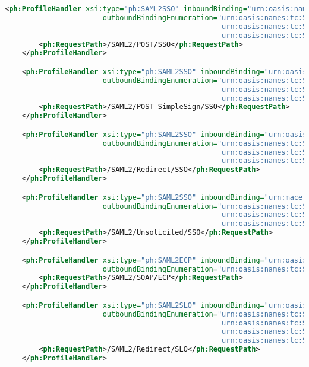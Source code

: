 \begin{lstlisting}[language=xml]
    <ph:ProfileHandler xsi:type="ph:SAML2SSO" inboundBinding="urn:oasis:names:tc:SAML:2.0:bindings:HTTP-POST"
                       outboundBindingEnumeration="urn:oasis:names:tc:SAML:2.0:bindings:HTTP-POST-SimpleSign
                                                   urn:oasis:names:tc:SAML:2.0:bindings:HTTP-POST
                                                   urn:oasis:names:tc:SAML:2.0:bindings:HTTP-Artifact">
        <ph:RequestPath>/SAML2/POST/SSO</ph:RequestPath>
    </ph:ProfileHandler>

    <ph:ProfileHandler xsi:type="ph:SAML2SSO" inboundBinding="urn:oasis:names:tc:SAML:2.0:bindings:HTTP-POST-SimpleSign"
                       outboundBindingEnumeration="urn:oasis:names:tc:SAML:2.0:bindings:HTTP-POST-SimpleSign
                                                   urn:oasis:names:tc:SAML:2.0:bindings:HTTP-POST
                                                   urn:oasis:names:tc:SAML:2.0:bindings:HTTP-Artifact">
        <ph:RequestPath>/SAML2/POST-SimpleSign/SSO</ph:RequestPath>
    </ph:ProfileHandler>

    <ph:ProfileHandler xsi:type="ph:SAML2SSO" inboundBinding="urn:oasis:names:tc:SAML:2.0:bindings:HTTP-Redirect"
                       outboundBindingEnumeration="urn:oasis:names:tc:SAML:2.0:bindings:HTTP-POST-SimpleSign
                                                   urn:oasis:names:tc:SAML:2.0:bindings:HTTP-POST
                                                   urn:oasis:names:tc:SAML:2.0:bindings:HTTP-Artifact">
        <ph:RequestPath>/SAML2/Redirect/SSO</ph:RequestPath>
    </ph:ProfileHandler>

    <ph:ProfileHandler xsi:type="ph:SAML2SSO" inboundBinding="urn:mace:shibboleth:2.0:profiles:AuthnRequest"
                       outboundBindingEnumeration="urn:oasis:names:tc:SAML:2.0:bindings:HTTP-POST-SimpleSign
                                                   urn:oasis:names:tc:SAML:2.0:bindings:HTTP-POST
                                                   urn:oasis:names:tc:SAML:2.0:bindings:HTTP-Artifact">
        <ph:RequestPath>/SAML2/Unsolicited/SSO</ph:RequestPath>
    </ph:ProfileHandler>

    <ph:ProfileHandler xsi:type="ph:SAML2ECP" inboundBinding="urn:oasis:names:tc:SAML:2.0:bindings:SOAP"
                       outboundBindingEnumeration="urn:oasis:names:tc:SAML:2.0:bindings:SOAP">
        <ph:RequestPath>/SAML2/SOAP/ECP</ph:RequestPath>
    </ph:ProfileHandler>

    <ph:ProfileHandler xsi:type="ph:SAML2SLO" inboundBinding="urn:oasis:names:tc:SAML:2.0:bindings:HTTP-Redirect"
                       outboundBindingEnumeration="urn:oasis:names:tc:SAML:2.0:bindings:HTTP-Redirect
                                                   urn:oasis:names:tc:SAML:2.0:bindings:HTTP-POST-SimpleSign
                                                   urn:oasis:names:tc:SAML:2.0:bindings:HTTP-POST
                                                   urn:oasis:names:tc:SAML:2.0:bindings:HTTP-Artifact">
        <ph:RequestPath>/SAML2/Redirect/SLO</ph:RequestPath>
    </ph:ProfileHandler>


\end{lstlisting}
